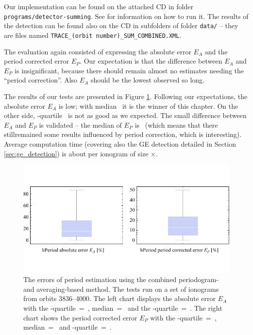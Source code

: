 Our implementation can be found on the attached CD in folder \texttt{programs/detector-summing}. See  for information on how to run it. The results of the detection can be found also on the CD in subfolders of folder \texttt{data/} -- they are files named \texttt{TRACE\_(orbit number)\_SUM\_COMBINED.XML}.

The evaluation again consisted of expressing the absolute error $E_A$ and the period corrected error $E_P$. Our expectation is that the difference between $E_A$ and $E_P$ is insignificant, because there should remain almost no estimates needing the ``period correction''. Also $E_A$ should be the lowest observed so long.

The results of our tests are presented in Figure \ref{fig:combined_errors}. Following our expectations, the absolute error $E_A$ is low; with median~ it is the winner of this chapter. On the other side, \mbox{}-quartile~ is not as good as we expected. The small difference between $E_A$ and $E_P$ is validated -- the median of $E_P$ is~ (which means that there stillremained some results influenced by period correction, which is interesting). Average computation time (covering also the GE detection detailed in Section \ref{sec:ge_detection}) is about  per ionogram of size $\times$.

\begin{figure}
	\centering
	\includegraphics[width=140mm]{images/combined_errors.pdf}
	\caption{The errors of period estimation using the combined periodogram- and averaging-based method. The tests run on a set of ionograms from orbits 3836--4000. The left chart displays the absolute error $E_A$ with the \mbox{-quartile}~=~, median~=~ and the \mbox{-quartile}~=~. The right chart shows the period corrected error $E_P$ with the \mbox{-quartile}~=~, median~=~ and \mbox{-quartile}~=~.}
	\label{fig:combined_errors}
\end{figure}

